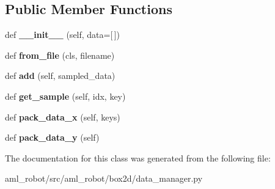 \subsection*{Public Member Functions}
\begin{DoxyCompactItemize}
\item 
\hypertarget{classaml__robot_1_1box2d_1_1data__manager_1_1_data_manager_aa0580187539e82c3ceac6917bffe62fa}{}\label{classaml__robot_1_1box2d_1_1data__manager_1_1_data_manager_aa0580187539e82c3ceac6917bffe62fa} 
def {\bfseries \+\_\+\+\_\+init\+\_\+\+\_\+} (self, data=\mbox{[}$\,$\mbox{]})
\item 
\hypertarget{classaml__robot_1_1box2d_1_1data__manager_1_1_data_manager_a400cf525806b262ec07a4432886ce611}{}\label{classaml__robot_1_1box2d_1_1data__manager_1_1_data_manager_a400cf525806b262ec07a4432886ce611} 
def {\bfseries from\+\_\+file} (cls, filename)
\item 
\hypertarget{classaml__robot_1_1box2d_1_1data__manager_1_1_data_manager_ae2ba6fa75c6aab8ec4f78248f6d829f1}{}\label{classaml__robot_1_1box2d_1_1data__manager_1_1_data_manager_ae2ba6fa75c6aab8ec4f78248f6d829f1} 
def {\bfseries add} (self, sampled\+\_\+data)
\item 
\hypertarget{classaml__robot_1_1box2d_1_1data__manager_1_1_data_manager_a2ccfb6f0938fccc05d6c44670d62e82e}{}\label{classaml__robot_1_1box2d_1_1data__manager_1_1_data_manager_a2ccfb6f0938fccc05d6c44670d62e82e} 
def {\bfseries get\+\_\+sample} (self, idx, key)
\item 
\hypertarget{classaml__robot_1_1box2d_1_1data__manager_1_1_data_manager_ab587949fcc69dcc51aef929531885c78}{}\label{classaml__robot_1_1box2d_1_1data__manager_1_1_data_manager_ab587949fcc69dcc51aef929531885c78} 
def {\bfseries pack\+\_\+data\+\_\+x} (self, keys)
\item 
\hypertarget{classaml__robot_1_1box2d_1_1data__manager_1_1_data_manager_afa6903e4df94e4f3addcd14a3bc6ca26}{}\label{classaml__robot_1_1box2d_1_1data__manager_1_1_data_manager_afa6903e4df94e4f3addcd14a3bc6ca26} 
def {\bfseries pack\+\_\+data\+\_\+y} (self)
\end{DoxyCompactItemize}


The documentation for this class was generated from the following file\+:\begin{DoxyCompactItemize}
\item 
aml\+\_\+robot/src/aml\+\_\+robot/box2d/data\+\_\+manager.\+py\end{DoxyCompactItemize}
